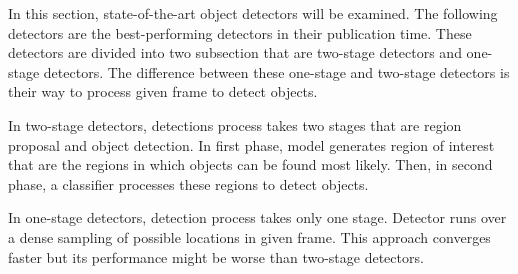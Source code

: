 \documentclass{article}
\begin{document}
\setlength{\parindent}{6ex}

\indent

In this section, state-of-the-art object detectors will be examined. 
The following detectors are the best-performing detectors in their 
publication time. These detectors are divided into two subsection that 
are two-stage detectors and one-stage detectors. The difference between 
these one-stage and two-stage detectors is their way to process given 
frame to detect objects. \par 

In two-stage detectors, detections process takes two stages that are 
region proposal and object detection. In first phase, model generates 
region of interest that are the regions in which objects can be found 
most likely. Then, in second phase, a classifier processes these regions 
to detect objects. \par

In one-stage detectors, detection process takes only one stage. 
Detector runs over a dense sampling of possible locations in given frame. 
This approach converges faster but its performance might be worse than 
two-stage detectors.
\end{document}
